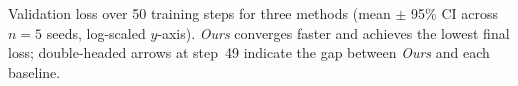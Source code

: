 \caption{Validation loss over 50 training steps for three methods (mean $\pm$ 95\% CI across $n{=}5$ seeds, log-scaled $y$-axis). \textit{Ours} converges faster and achieves the lowest final loss; double-headed arrows at step~49 indicate the gap between \textit{Ours} and each baseline.}
